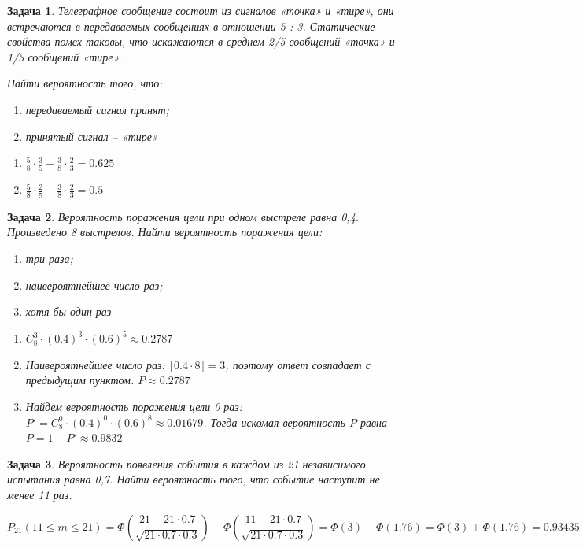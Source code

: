 \documentclass{article}
\theoremstyle{problemstyle}
\newtheorem{problem}{Задача}[section]
\begin{document}
\begin{problem}
    Телеграфное сообщение состоит из сигналов «точка» и «тире»,
    они встречаются в передаваемых сообщениях в отношении 5 : 3.
    Статические свойства помех таковы, что искажаются в среднем
    2/5 сообщений «точка» и 1/3 сообщений «тире».

    Найти вероятность того, что:
    \begin{enumerate}
        \item передаваемый сигнал принят;
        \item принятый сигнал – «тире»
    \end{enumerate}

    \begin{enumerate}
        \item $ \frac{5}{8} \cdot \frac{3}{5} + \frac{3}{8} \cdot \frac{2}{3} = 0.625 $

        \item $ \frac{5}{8} \cdot \frac{2}{5} + \frac{3}{8} \cdot \frac{2}{3} = 0.5 $
    \end{enumerate}
\end{problem}

\begin{problem}
    Вероятность поражения цели при одном выстреле равна 0,4.
    Произведено 8 выстрелов.
    Найти вероятность поражения цели:
    \begin{enumerate}
        \item три раза;
        \item наивероятнейшее число раз;
        \item хотя бы один раз
    \end{enumerate}

    \begin{enumerate}
        \item $C_8^3 \cdot (0.4)^3 \cdot (0.6)^5 \approx 0.2787$
        \item Наивероятнейшее число раз: $\lfloor 0.4 \cdot 8 \rfloor = 3$,
            поэтому ответ совпадает с предыдущим пунктом. $P \approx 0.2787$
        \item Найдем вероятность поражения цели 0 раз:
            $ P' = C_8^0 \cdot (0.4)^0 \cdot (0.6)^8 \approx 0.01679 $.
            Тогда искомая вероятность $P$ равна
            $P = 1 - P' \approx 0.9832 $
    \end{enumerate}
\end{problem}

\begin{problem}
    Вероятность появления события в каждом из 21 независимого испытания равна 0,7.
    Найти вероятность того, что событие наступит не менее 11 раз.

    \[
        P_{21}(11 \leq m \leq 21) =
        \Phi \left( \frac{21 - 21 \cdot 0.7}{\sqrt{21 \cdot 0.7 \cdot 0.3}} \right)
        -
        \Phi \left( \frac{11 - 21 \cdot 0.7}{\sqrt{21 \cdot 0.7 \cdot 0.3}} \right)
        =
        \Phi \left(3\right)
        -
        \Phi \left(1.76\right)
        =
        \Phi (3) + \Phi(1.76)
        =
        0.93435
    \]
\end{problem}
\end{document}
